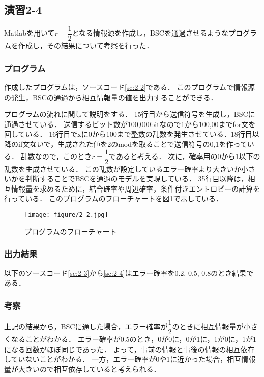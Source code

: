 \documentclass[documentclass]{jsarticle}
\begin{document}
\subsection*{演習2-4}
Matlabを用いて$r = \dfrac{1}{2}$となる情報源を作成し，BSCを通過させるようなプログラムを作成し，その結果について考察を行った．

\subsubsection*{プログラム}
作成したプログラムは，ソースコード\ref*{sc:2-2}である．
このプログラムで情報源の発生，BSCの通過から相互情報量の値を出力することができる．

プログラムの流れに関して説明をする．
15行目から送信符号を生成し，BSCに通過させている．
送信するビット数が100,000bitなので1から100,00までfor文を回している．
16行目でxに0から100まで整数の乱数を発生させている．18行目以降のif文ないで，生成された値を2のmodを取ることで送信符号の0,1を作っている．
乱数なので，このとき$r = \dfrac{1}{2}$であると考える．
次に，確率用の0から1以下の乱数を生成させている．
この乱数が設定しているエラー確率より大きいか小さいかを判断することでBSCを通過のモデルを実現している．
35行目以降は，相互情報量を求めるために，結合確率や周辺確率，条件付きエントロピーの計算を行っている．
このプログラムのフローチャートを図\ref*{fig:2-3}で示している．



\begin{figure}[H]
  \begin{center}
    \texttt{[image: figure/2-2.jpg]}
  \end{center}
  \caption{プログラムのフローチャート}
  \label{fig:2-3}
\end{figure}


\subsubsection*{出力結果}
以下のソースコード\ref*{sc:2-3}から\ref*{sc:2-4}はエラー確率を0.2, 0.5, 0.8のとき結果である．





\subsubsection*{考察}
上記の結果から，BSCに通した場合，エラー確率が$\dfrac{1}{2}$のときに相互情報量が小さくなることがわかる．
エラー確率が0.5のとき，0が0に，0が1に，1が0に，1が1になる回数がほぼ同じであった．
よって，事前の情報と事後の情報の相互依存していないことがわかる．
一方，エラー確率が0や1に近かった場合，相互情報量が大きいので相互依存していると考えられる．
\end{document}
